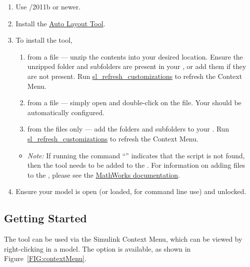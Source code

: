 \documentclass{article}
\newcommand{\menu}[1]{%
	\ifthenelse{\equal{#1}{1}}{Flatten Subsystem}{}%
  	\ifthenelse{\equal{#1}{2}}{?}{}%
}
\begin{document}
\begin{enumerate}
	\item Use \Matlab/\Simulink 2011b or newer.
	\item Install the \href{https://www.mathworks.com/matlabcentral/fileexchange/51228-auto-layout-tool}{Auto Layout Tool}.
	\item To install the tool,
	\begin{enumerate}
		\item from a  file --- unzip the contents into your desired location. Ensure the unzipped folder and subfolders are present in your \mpath, or add them if they are not present. Run \href{https://www.mathworks.com/help/simulink/ug/registering-customizations.html}{sl\_refresh\_customizations} to refresh the Context Menu. 
		\item from a  file --- simply open \Matlab and double-click on the file. Your \mpath should be automatically configured.
		\item from the files only --- add the folders and subfolders to your \mpath. Run \href{https://www.mathworks.com/help/simulink/ug/registering-customizations.html}{sl\_refresh\_customizations} to refresh the Context Menu.
	\end{enumerate}
	\begin{itemize}
		\item \textit{Note:} If running the command ``'' indicates that the script is not found, then the tool needs to be added to the \mpath.
		For information on adding files to the \mpath, please see the \href{https://www.mathworks.com/help/matlab/matlab_env/add-remove-or-reorder-folders-on-the-search-path.html}{MathWorks documentation}.
	\end{itemize}
	\item Ensure your model is open (or loaded, for command line use) and unlocked.
\end{enumerate}

\subsection{Getting Started}
The tool can be used via the Simulink Context Menu, which can be viewed by right-clicking in a model. The \emph{\menu{1}} option is available, as shown in Figure~\ref{FIG:contextMenu}.
\end{document}

